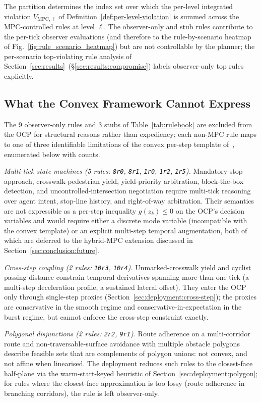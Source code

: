 The partition determines the index set over which the per-level integrated violation $V_{\mathrm{MPC}, \ell}$ of Definition~\ref{def:per-level-violation} is summed across the MPC-controlled rules at level $\ell$. The observer-only and stub rules contribute to the per-tick observer evaluations (and therefore to the rule-by-scenario heatmap of Fig.~\ref{fig:rule_scenario_heatmap}) but are not controllable by the planner; the per-scenario top-violating rule analysis of Section~\ref{sec:results}~(\S\ref{sec:results:compromise}) labels observer-only top rules explicitly.

\subsection{What the Convex Framework Cannot Express}
\label{sec:rulebook:limits}

The 9 observer-only rules and 3 stubs of Table~\ref{tab:rulebook} are excluded from the OCP for structural reasons rather than expediency; each non-MPC rule maps to one of three identifiable limitations of the convex per-step template of~\cite{lcp2025}, enumerated below with counts.

\emph{Multi-tick state machines (5 rules: \texttt{8r0}, \texttt{8r1}, \texttt{1r0}, \texttt{1r2}, \texttt{1r5}).} Mandatory-stop approach, crosswalk-pedestrian yield, yield-priority arbitration, block-the-box detection, and uncontrolled-intersection negotiation require multi-tick reasoning over agent intent, stop-line history, and right-of-way arbitration. Their semantics are not expressible as a per-step inequality $g(z_k) \leq 0$ on the OCP's decision variables and would require either a discrete mode variable (incompatible with the convex template) or an explicit multi-step temporal augmentation, both of which are deferred to the hybrid-MPC extension discussed in Section~\ref{sec:conclusion:future}.

\emph{Cross-step coupling (2 rules: \texttt{10r3}, \texttt{10r4}).} Unmarked-crosswalk yield and cyclist passing distance constrain temporal derivatives spanning more than one tick (a multi-step deceleration profile, a sustained lateral offset). They enter the OCP only through single-step proxies (Section~\ref{sec:deployment:cross-step}); the proxies are conservative in the smooth regime and conservative-in-expectation in the burst regime, but cannot enforce the cross-step constraint exactly.

\emph{Polygonal disjunctions (2 rules: \texttt{2r2}, \texttt{9r1}).} Route adherence on a multi-corridor route and non-traversable-surface avoidance with multiple obstacle polygons describe feasible sets that are complements of polygon unions: not convex, and not affine when linearised. The deployment reduces such rules to the closest-face half-plane via the warm-start-keyed heuristic of Section~\ref{sec:deployment:polygon}; for rules where the closest-face approximation is too lossy (route adherence in branching corridors), the rule is left observer-only.


